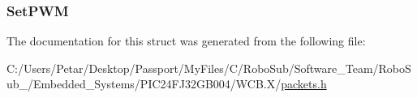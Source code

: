 \subsubsection[{Set\+P\+W\+M}]{ Set\+P\+W\+M}\label{struct_packet_dropper_set_struct_a5cf541f026d00020994dee26f3d9f8d1}


The documentation for this struct was generated from the following file\+:\begin{DoxyCompactItemize}
\item 
C\+:/\+Users/\+Petar/\+Desktop/\+Passport/\+My\+Files/\+C/\+Robo\+Sub/\+Software\+\_\+\+Team/\+Robo\+Sub\+\_/\+Embedded\+\_\+\+Systems/\+P\+I\+C24\+F\+J32\+G\+B004/\+W\+C\+B.\+X/\hyperlink{_w_c_b_8_x_2packets_8h}{packets.\+h}\end{DoxyCompactItemize}
